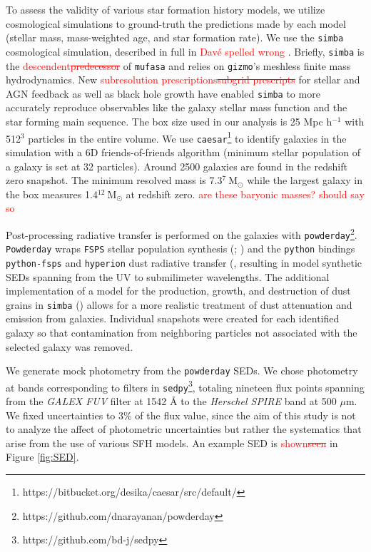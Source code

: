 \documentclass[twocolumn]{aastex62}
\newcommand{\red}[1]{{\textcolor{red}{#1}}}
\begin{document}
To assess the validity of various star formation history models, we utilize cosmological simulations to ground-truth the predictions made by each model (stellar mass, mass-weighted age, and star formation rate). We use the \texttt{simba} cosmological simulation, described in full in \red{Dav\'e spelled wrong} \cite{dave_simba:_2019}. Briefly, \texttt{simba} is the \red{descendent\sout{predecessor}} of \texttt{mufasa} and relies on \texttt{gizmo}'s meshless finite mass hydrodynamics. New \red{subresolution prescriptions\sout{subgrid prescripts}} for stellar and AGN feedback as well as black hole growth have enabled \texttt{simba} to more accurately reproduce observables like the galaxy stellar mass function and the star forming main sequence. The box size used in our analysis is 25 Mpc h$^{-1}$ with 512$^3$ particles in the entire volume.  We use \texttt{caesar}\footnote{https://bitbucket.org/desika/caesar/src/default/} to identify galaxies in the simulation with a 6D friends-of-friends algorithm (minimum stellar population of a galaxy is set at 32 particles). Around 2500 galaxies are found in the redshift zero snapshot.  The minimum resolved mass is 7.3$^7 \: \mathrm{M}_{\odot}$ while the largest galaxy in the box measures 1.4$^{12} \: \mathrm{M}_{\odot}$ at redshift zero. \red{are these baryonic masses? should say so}

Post-processing radiative transfer is performed on the galaxies with \texttt{powderday}\footnote{https://github.com/dnarayanan/powderday}. \texttt{Powderday} wraps \texttt{FSPS} stellar population synthesis (\cite{conroy_propagation_2009}; \cite{conroy_propagation_2010}) and the \texttt{python} bindings \texttt{python-fsps} and \texttt{hyperion} dust radiative transfer (\cite{robitaille_hyperion:_2011}, resulting in model synthetic SEDs spanning from the UV to submilimeter wavelengths. The additional implementation of a model for the production, growth, and destruction of dust grains in \texttt{simba} (\cite{li_dust--gas_2019}) allows for a more realistic treatment of dust attenuation and emission from galaxies. Individual snapshots were created for each identified galaxy so that contamination from neighboring particles not associated with the selected galaxy was removed. 

We generate mock photometry from the \texttt{powderday} SEDs. We chose photometry at bands corresponding to filters in \texttt{sedpy}\footnote{https://github.com/bd-j/sedpy}, totaling nineteen flux points spanning from the \textit{GALEX FUV} filter at 1542 {\AA} to the \textit{Herschel SPIRE} band at 500 $\mu$m. We fixed uncertainties to 3\% of the flux value, since the aim of this study is not to analyze the affect of photometric uncertainties but rather the systematics that arise from the use of various SFH models. An example SED is \red{shown\sout{seen}} in Figure \ref{fig:SED}.
\end{document}
